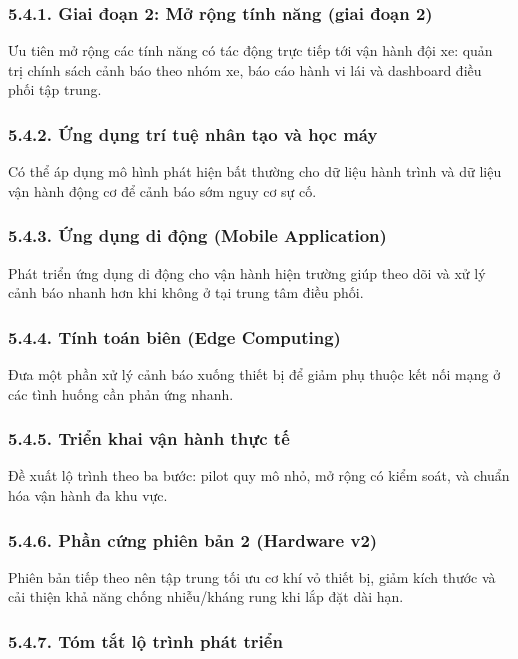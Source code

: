 \documentclass[a4paper]{extarticle}
\begin{document}
\subsubsection{5.4.1. Giai đoạn 2: Mở rộng tính năng (giai đoạn 2)}

Ưu tiên mở rộng các tính năng có tác động trực tiếp tới vận hành đội xe: quản trị chính sách cảnh báo theo nhóm xe, báo cáo hành vi lái và dashboard điều phối tập trung.

\subsubsection{5.4.2. Ứng dụng trí tuệ nhân tạo và học máy}

Có thể áp dụng mô hình phát hiện bất thường cho dữ liệu hành trình và dữ liệu vận hành động cơ để cảnh báo sớm nguy cơ sự cố.

\subsubsection{5.4.3. Ứng dụng di động (Mobile Application)}

Phát triển ứng dụng di động cho vận hành hiện trường giúp theo dõi và xử lý cảnh báo nhanh hơn khi không ở tại trung tâm điều phối.

\subsubsection{5.4.4. Tính toán biên (Edge Computing)}

Đưa một phần xử lý cảnh báo xuống thiết bị để giảm phụ thuộc kết nối mạng ở các tình huống cần phản ứng nhanh.

\subsubsection{5.4.5. Triển khai vận hành thực tế}

Đề xuất lộ trình theo ba bước: pilot quy mô nhỏ, mở rộng có kiểm soát, và chuẩn hóa vận hành đa khu vực.

\subsubsection{5.4.6. Phần cứng phiên bản 2 (Hardware v2)}

Phiên bản tiếp theo nên tập trung tối ưu cơ khí vỏ thiết bị, giảm kích thước và cải thiện khả năng chống nhiễu/kháng rung khi lắp đặt dài hạn.

\subsubsection{5.4.7. Tóm tắt lộ trình phát triển}
\end{document}

